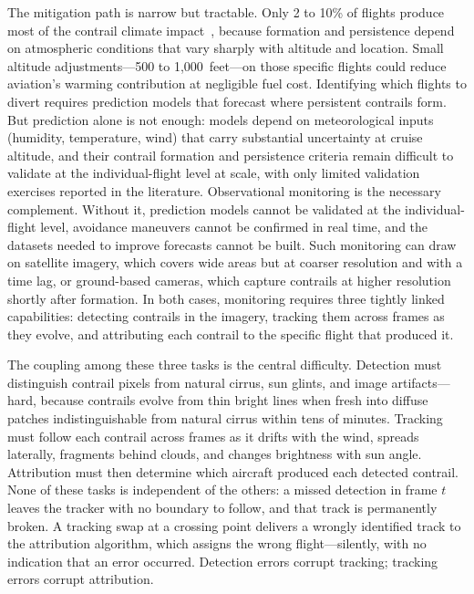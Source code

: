 \documentclass[review]{elsarticle}
\begin{document}
The mitigation path is narrow but tractable. Only 2 to 10\% of flights produce most of the contrail climate impact~\cite{teoh2020mitigating}, because formation and persistence depend on atmospheric conditions that vary sharply with altitude and location. Small altitude adjustments---500 to 1,000~feet---on those specific flights could reduce aviation's warming contribution at negligible fuel cost. Identifying which flights to divert requires prediction models that forecast where persistent contrails form. But prediction alone is not enough: models depend on meteorological inputs (humidity, temperature, wind) that carry substantial uncertainty at cruise altitude, and their contrail formation and persistence criteria
remain difficult to validate at the individual-flight level at scale, with only limited validation exercises reported in the literature. Observational monitoring is the necessary complement. Without it, prediction models cannot be validated at the individual-flight level, avoidance maneuvers cannot be confirmed in real time, and the datasets needed to improve forecasts cannot be built. Such monitoring can draw on satellite imagery, which covers wide areas but at coarser resolution and with a time lag, or ground-based cameras, which capture contrails at higher resolution shortly after formation. In both cases, monitoring requires three tightly linked capabilities: detecting contrails in the imagery, tracking them across frames as they evolve, and attributing each contrail to the specific flight that produced it.

The coupling among these three tasks is the central difficulty. Detection must distinguish contrail pixels from natural cirrus, sun glints, and image artifacts---hard, because contrails evolve from thin bright lines when fresh into diffuse patches indistinguishable from natural cirrus within tens of minutes. Tracking must follow each contrail across frames as it drifts with the wind, spreads laterally, fragments behind clouds, and changes brightness with sun angle. Attribution must then determine which aircraft produced each detected contrail. None of these tasks is independent of the others: a missed detection in frame $t$ leaves the tracker with no boundary to follow, and that track is permanently broken. A tracking swap at a crossing point delivers a wrongly identified track to the attribution algorithm, which assigns the wrong flight---silently, with no indication that an error occurred. Detection errors corrupt tracking; tracking errors corrupt attribution.
\end{document}
